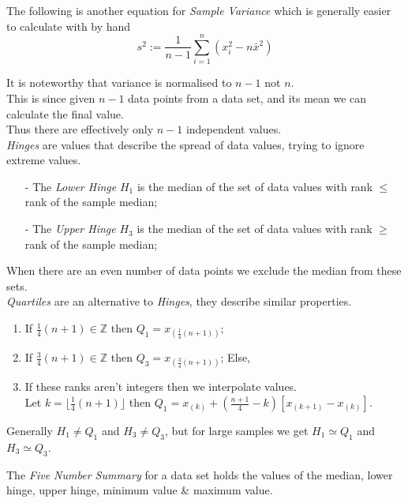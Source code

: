 \documentclass[11pt,a4paper]{article}
\begin{document}
The following is another equation for \textit{Sample Variance} which is generally easier to calculate with by hand
$$s^2:=\dfrac{1}{n-1}\sum\limits_{i=1}^n(x_i^2-n\bar{x}^2)$$

It is noteworthy that variance is normalised to $n-1$ not $n$.\\
This is since given $n-1$ data points from a data set, and its mean we can calculate the final value.\\
Thus there are effectively only $n-1$ independent values.\\

\textit{Hinges} are values that describe the spread of data values, trying to ignore extreme values.
\begin{itemize}
	\item[-] The \textit{Lower Hinge} $H_1$ is the median of the set of data values with rank $\leq$ rank of the sample median;
	\item[-] The \textit{Upper Hinge} $H_3$ is the median of the set of data values with rank $\geq$ rank of the sample median;
\end{itemize}
\nb When there are an even number of data points we exclude the median from these sets.\\

\textit{Quartiles} are an alternative to \textit{Hinges}, they describe similar properties.
\begin{enumerate}[label=\roman*)]
	\item If $\frac{1}{4}(n+1)\in\mathbb{Z}$ then $Q_1=x_{(\frac{1}{4}(n+1))}$;
	\item If $\frac{3}{4}(n+1)\in\mathbb{Z}$ then $Q_3=x_{(\frac{3}{4}(n+1))}$; Else,
	\item If these ranks aren't integers then we interpolate values.\\
	Let $k=\lfloor\frac{1}{4}(n+1)\rfloor$ then $Q_1=x_{(k)}+\left(\frac{n+1}{4}-k\right)[x_{(k+1)}-x_{(k)}]$.%
\end{enumerate}

Generally $H_1\neq Q_1$ and $H_3\neq Q_3$, but for large samples we get $H_1\simeq Q_1$ and $H_3\simeq Q_3$.

The \textit{Five Number Summary} for a data set holds the values of the median, lower hinge, upper hinge, minimum value \& maximum value.\\
\end{document}
